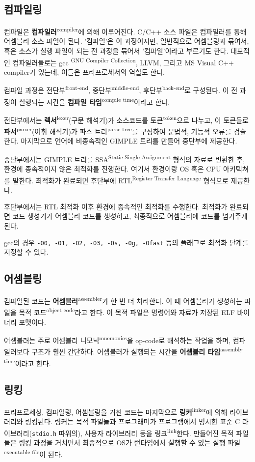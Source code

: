 \documentclass[runningheads]{llncs}
\newcommand{\translation}[1]{\textsuperscript{#1}}
\begin{document}
\subsection{컴파일링}
컴파일은 \textbf{컴파일러}\translation{compiler}에 의해 이루어진다. C/C++ 소스 파일은 컴파일러를 통해 어셈블리 소스 파일이 된다. '컴파일'은 이 과정이지만, 일반적으로 어셈블링과 묶여서, 혹은 소스가 실행 파일이 되는 전 과정을 묶어서 '컴파일'이라고 부르기도 한다. 대표적인 컴파일러들로는 gcc \translation{GNU Compiler Collection}, LLVM, 그리고 MS Visual C++ compiler가 있는데, 이들은 프리프로세서의 역할도 한다.

컴파일 과정은 전단부\translation{front-end}, 중단부\translation{middle-end}, 후단부\translation{back-end}로 구성된다. 이 전 과정이 실행되는 시간을 \textbf{컴파일 타임}\translation{compile time}이라고 한다.

전단부에서는 \textbf{렉서}\translation{lexer}(구문 해석기)가 소스코드를 토큰\translation{token}으로 나누고, 이 토큰들로 \textbf{파서}\translation{parser}(어휘 해석기)가 파스 트리\translation{parse tree}를 구성하여 문법적, 기능적 오류를 검출한다. 마지막으로 언어에 비종속적인 GIMPLE 트리를 만들어 중단부에 제공한다.

중단부에서는 GIMPLE 트리를 SSA\translation{Static Single Assignment} 형식의 자료로 변환한 후, 환경에 종속적이지 않은 최적화를 진행한다. 여기서 환경이랑 OS 혹은 CPU 아키텍쳐를 말한다. 최적화가 완료되면 후단부에 RTL\translation{Register Transfer Language} 형식으로 제공한다.

후단부에서는 RTL 최적화 이후 환경에 종속적인 최적화를 수행한다. 최적화가 완료되면 코드 생성기가 어셈블리 코드를 생성하고, 최종적으로 어셈블러에 코드를 넘겨주게 된다.

gcc의 경우 \texttt{-O0, -O1, -O2, -O3, -Os, -Og, -Ofast} 등의 플래그로 최적화 단계를 지정할 수 있다.

\subsection{어셈블링}
컴파일된 코드는 \textbf{어셈블러}\translation{assembler}가 한 번 더 처리한다. 이 때 어셈블러가 생성하는 파일을 목적 코드\translation{object code}라고 한다. 이 목적 파일은 명령어와 자료가 저장된 ELF 바이너리 포맷이다. 

어셈블러는 주로 어셈블리 니모닉\translation{mnemonics}을 op-code로 해석하는 작업을 하며, 컴파일러보다 구조가 훨씬 간단하다. 어셈블러가 실행되는 시간을 \textbf{어셈블리 타임}\translation{assembly time}이라고 한다.

\subsection{링킹}
프리프로세싱, 컴파일링, 어셈블링을 거친 코드는 마지막으로 \textbf{링커}\translation{linker}에 의해 라이브러리와 링킹된다. 링커는 목적 파일들과 프로그래머가 프로그램에서 명시한 표준 C 라이브러리(\texttt{stdio.h} 따위의), 사용자 라이브러리 등을 링크\translation{link}한다. 만들어진 목적 파일들은 링킹 과정을 거치면서 최종적으로 OS가 런타임에서 실행할 수 있는 실행 파일\translation{executable file}이 된다.
\end{document}
